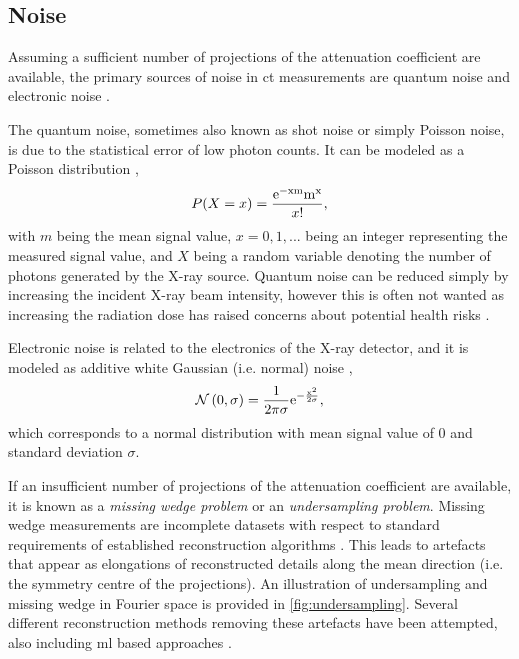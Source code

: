 \subsection{Noise}
\label{sec:ct:theory:noise}
Assuming a sufficient number of projections of the attenuation coefficient are available, the primary sources of noise in \gls{ct} measurements are quantum noise and electronic noise \cite{boas2012ct}. 

The quantum noise, sometimes also known as shot noise or simply Poisson noise, is due to the statistical error of low photon counts. It can be modeled as a Poisson distribution \cite{Whiting2006},
\begin{equation}
    \label{eq:poissonnoise}
    P(X = x) = \frac{\rm{e}^{-xm}m^x}{x!},
\end{equation}
with $m$ being the mean signal value, $x=0,1,...$ being an integer representing the measured signal value, and $X$ being a random variable denoting the number of photons generated by the X-ray source. Quantum noise can be reduced simply by increasing the incident X-ray beam intensity, however this is often not wanted as increasing the radiation dose has raised concerns about potential health risks \cite{doi:10.1056/NEJMra072149,PEARCE2012499}. 

Electronic noise is related to the electronics of the X-ray detector, and it is modeled as additive white Gaussian (i.e. normal) noise \cite{boas2012ct},
\begin{equation}
    \mathcal{N}\left(0,\sigma \right) = \frac{1}{2\pi\sigma}\rm{e}^{-\frac{x^2}{2\sigma}},
\end{equation}
which corresponds to a normal distribution with mean signal value of $0$ and standard deviation $\sigma$.

If an insufficient number of projections of the attenuation coefficient are available, it is known as a \textit{missing wedge problem} or an \textit{undersampling problem}. Missing wedge measurements are incomplete datasets with respect to standard requirements of established reconstruction algorithms \cite{10.1111/jmi.12313}. This leads to artefacts that appear as elongations of reconstructed details along the mean direction (i.e. the symmetry centre of the projections). An illustration of undersampling and missing wedge in Fourier space is provided in \cref{fig:undersampling}. Several different reconstruction methods removing these artefacts have been attempted, also including \gls{ml} based approaches \cite{liu2020tomogan,GANrec}. 

